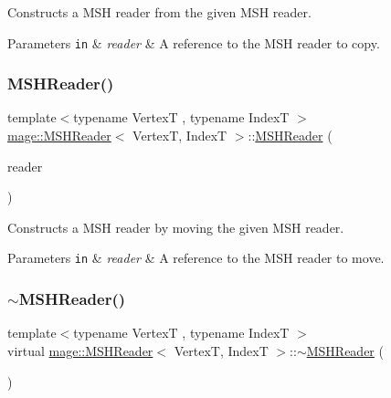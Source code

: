 Constructs a M\+SH reader from the given M\+SH reader.


\begin{DoxyParams}[1]{Parameters}
\mbox{\tt in}  & {\em reader} & A reference to the M\+SH reader to copy. \\
\hline
\end{DoxyParams}
\hypertarget{classmage_1_1_m_s_h_reader_a3c34d4fed2a717a2589dff1609f7c8b4}{}\label{classmage_1_1_m_s_h_reader_a3c34d4fed2a717a2589dff1609f7c8b4} 
\subsubsection{\texorpdfstring{M\+S\+H\+Reader()}{MSHReader()}\hspace{0.1cm}{\footnotesize\ttfamily [3/3]}}
{\footnotesize\ttfamily template$<$typename VertexT , typename IndexT $>$ \\
\hyperlink{classmage_1_1_m_s_h_reader}{mage\+::\+M\+S\+H\+Reader}$<$ VertexT, IndexT $>$\+::\hyperlink{classmage_1_1_m_s_h_reader}{M\+S\+H\+Reader} (\begin{DoxyParamCaption}\item[{\hyperlink{classmage_1_1_m_s_h_reader}{M\+S\+H\+Reader}$<$ VertexT, IndexT $>$ \&\&}]{reader }\end{DoxyParamCaption})}

Constructs a M\+SH reader by moving the given M\+SH reader.


\begin{DoxyParams}[1]{Parameters}
\mbox{\tt in}  & {\em reader} & A reference to the M\+SH reader to move. \\
\hline
\end{DoxyParams}
\hypertarget{classmage_1_1_m_s_h_reader_a6e1f882fa81362f744f438a1f992b182}{}\label{classmage_1_1_m_s_h_reader_a6e1f882fa81362f744f438a1f992b182} 
\subsubsection{\texorpdfstring{$\sim$\+M\+S\+H\+Reader()}{~MSHReader()}}
{\footnotesize\ttfamily template$<$typename VertexT , typename IndexT $>$ \\
virtual \hyperlink{classmage_1_1_m_s_h_reader}{mage\+::\+M\+S\+H\+Reader}$<$ VertexT, IndexT $>$\+::$\sim$\hyperlink{classmage_1_1_m_s_h_reader}{M\+S\+H\+Reader} (\begin{DoxyParamCaption}{ }\end{DoxyParamCaption})\hspace{0.3cm}{\ttfamily [virtual]}}

